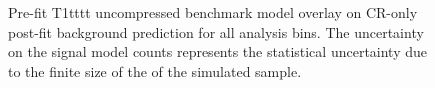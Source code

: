 \begin{figure}[h!]
\begin{center}
{            \label{fig:T1tttt_compressed_MR_4j}
        } \\
         ~~
         \\
        \caption{
            Pre-fit T1tttt uncompressed benchmark model overlay on CR-only
            post-fit background prediction for all analysis bins. The
            uncertainty on the signal model counts represents the statistical
            uncertainty due to the finite size of the of the simulated sample.
        }
        \label{fig:T1tttt_uncompressed_MR}
    \end{center}
\end{figure}

